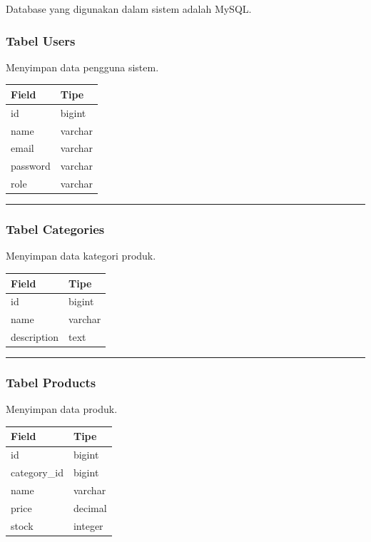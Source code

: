 Database yang digunakan dalam sistem adalah MySQL.

\subsubsection{Tabel Users}\label{tabel-users}

Menyimpan data pengguna sistem.

{\def\LTcaptype{none} %
\begin{longtable}[]{@{}ll@{}}
\toprule\noalign{}
Field & Tipe \\
\midrule\noalign{}
\endhead
\bottomrule\noalign{}
\endlastfoot
id & bigint \\
name & varchar \\
email & varchar \\
password & varchar \\
role & varchar \\
\end{longtable}
}

\begin{center}\rule{0.5\linewidth}{0.5pt}\end{center}

\subsubsection{Tabel Categories}\label{tabel-categories}

Menyimpan data kategori produk.

{\def\LTcaptype{none} %
\begin{longtable}[]{@{}ll@{}}
\toprule\noalign{}
Field & Tipe \\
\midrule\noalign{}
\endhead
\bottomrule\noalign{}
\endlastfoot
id & bigint \\
name & varchar \\
description & text \\
\end{longtable}
}

\begin{center}\rule{0.5\linewidth}{0.5pt}\end{center}

\subsubsection{Tabel Products}\label{tabel-products}

Menyimpan data produk.

{\def\LTcaptype{none} %
\begin{longtable}[]{@{}ll@{}}
\toprule\noalign{}
Field & Tipe \\
\midrule\noalign{}
\endhead
\bottomrule\noalign{}
\endlastfoot
id & bigint \\
category\_id & bigint \\
name & varchar \\
price & decimal \\
stock & integer \\
\end{longtable}
}

